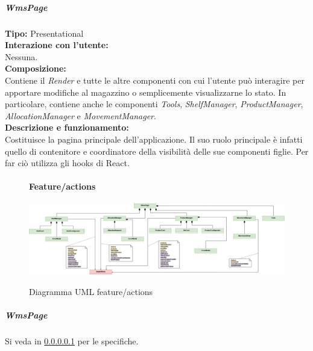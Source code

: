 \subparagraph{\colorbox{verde_uml}{WmsPage}}\label{wmsPage}
\textbf{Tipo:} Presentational \\
\textbf{Interazione con l'utente:} \\
Nessuna.\\
\textbf{Composizione:} \\
Contiene il \textit{Render} e tutte le altre componenti con cui l'utente può interagire per apportare modifiche al magazzino o semplicemente visualizzarne lo stato. In particolare, contiene anche le componenti \textit{Tools}, \textit{ShelfManager}, \textit{ProductManager}, \textit{AllocationManager} e \textit{MovementManager}.\\
\textbf{Descrizione e funzionamento:} \\
Costituisce la pagina principale dell'applicazione. Il suo ruolo principale è infatti quello di contenitore e coordinatore della visibilità delle sue componenti figlie. Per far ciò utilizza gli hooks di React.\\

\begin{landscape}
\begin{figure}[H]
    \paragraph{Feature/actions}
    \centering
    \includegraphics[width=1.5\textwidth]{images/UML/feature_actions.drawio.png}
    \label{fig:UML_feature_actions}
    \caption{Diagramma UML feature/actions}
\end{figure}
\end{landscape}
\newpage

\subparagraph{\colorbox{verde_uml}{WmsPage}}
Si veda in \ref{wmsPage} per le specifiche.

